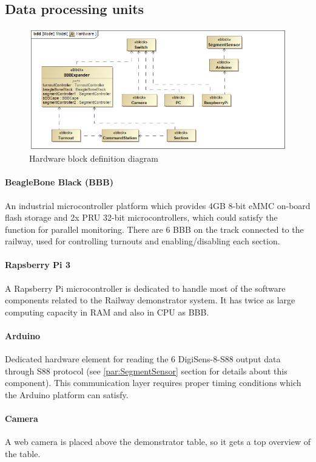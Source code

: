 \subsection{Data processing units}
\begin{figure}[ht]
	\centering
	\includegraphics[width=150mm]{figures/modes3/Hardware.png}
	\caption{Hardware block definition diagram}
	\label{fig:Modes3HWBDD}
\end{figure}

\paragraph{BeagleBone Black (BBB)}
An industrial microcontroller platform which provides 4GB 8-bit eMMC on-board flash storage and 2x PRU 32-bit microcontrollers, which could satisfy the function for parallel monitoring. There are 6 BBB on the track connected to the railway, used for controlling turnouts and enabling/disabling each section.

\paragraph{Rapsberry Pi 3}
A Rapsberry Pi microcontroller is dedicated to handle most of the software components related to the Railway demonstrator system. It has twice as large computing capacity in RAM and also in CPU as BBB.

\paragraph{Arduino}
Dedicated hardware element for reading the 6 DigiSens-8-S88 output data through S88 protocol (see \ref{par:SegmentSensor} section for details about this component). This communication layer requires proper timing conditions which the Arduino platform can satisfy.

\paragraph{Camera}
A web camera is placed above the demonstrator table, so it gets a top overview of the table.

